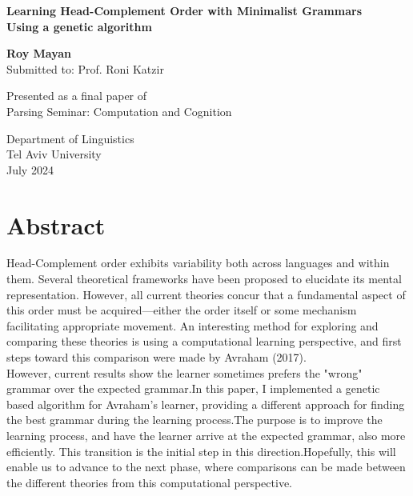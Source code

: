 \documentclass{article}
\begin{document}
\begin{titlepage}
    \begin{center}
	\vspace*{2cm}
        	\huge
        	\textbf{Learning Head-Complement Order with Minimalist Grammars \newline \\ Using a genetic algorithm}


            
        	\vspace{2cm}
        	\LARGE
        	\textbf{Roy Mayan}\\
       	Submitted to: Prof. Roni Katzir 
            
        	\vfill
          
	Presented as a final paper of\\
	Parsing Seminar: Computation and Cognition
            
        	\vspace{0.8cm}
            
        	\Large
       	Department of Linguistics\\
       	Tel Aviv University\\
        	July 2024
    \end{center}
\end{titlepage}


\section*{Abstract}
{\sffamily\small
Head-Complement order exhibits variability both across languages and within them. Several theoretical frameworks have been proposed to elucidate its mental representation. However, all current theories concur that a fundamental aspect of this order must be acquired—either the order itself or some mechanism facilitating appropriate movement. An interesting method for exploring and comparing these theories is using a computational learning perspective, and first steps toward this comparison were made by Avraham (2017). \\
However, current results show the learner sometimes prefers the "wrong" grammar over the expected grammar.In this paper, I implemented a genetic based algorithm for Avraham's learner, providing a different approach for finding the best grammar during the learning process.The purpose is to improve the learning process, and have the learner arrive at the expected grammar, also more efficiently.  This transition is the initial step in this direction.Hopefully, this will enable us to advance to the next phase, where comparisons can be made between the different theories from this computational perspective.
}
\end{document}
